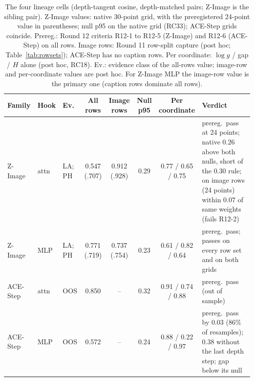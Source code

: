 \documentclass[11pt]{article}
\begin{document}
\begin{table}[htbp]
\centering\small
\caption{The four lineage cells (depth-tangent cosine, depth-matched pairs; Z-Image is the sibling pair). Z-Image values: native 30-point grid, with the preregistered 24-point value in parentheses; null p95 on the native grid (RC33); ACE-Step grids coincide. Prereg.: Round 12 criteria R12-1 to R12-5 (Z-Image) and R12-6 (ACE-Step) on all rows. Image rows: Round 11 row-split capture (post hoc; Table~\ref{tab:rowsets}); ACE-Step has no caption rows. Per coordinate: $\log g$ / gap / $H$ alone (post hoc, RC18). Ev.: evidence class of the all-rows value; image-row and per-coordinate values are post hoc. For Z-Image MLP the image-row value is the primary one (caption rows dominate all rows).}
\label{tab:cells}
\setlength\tabcolsep{4pt}\begin{tabularx}{\linewidth}{@{}lllccccL@{}}
\toprule
Family & Hook & Ev. & All rows & Image rows & Null p95 & Per coordinate & Verdict\\
\midrule
Z-Image & attn & LA; PH & 0.547 (.707) & 0.912 (.928) & 0.29 & 0.77 / 0.65 / 0.75 & prereg.\ pass at 24 points; native $0.26$ above both nulls, short of the $0.30$ rule; on image rows (24 points) within $0.07$ of same weights (fails R12-2)\\
Z-Image & MLP & LA; PH & 0.771 (.719) & 0.737 (.754) & 0.23 & 0.61 / 0.82 / 0.64 & prereg.\ pass; passes on every row set and on both grids\\
ACE-Step & attn & OOS & 0.850 & -- & 0.32 & 0.91 / 0.74 / 0.88 & prereg.\ pass (out of sample)\\
ACE-Step & MLP & OOS & 0.572 & -- & 0.24 & 0.88 / 0.22 / 0.97 & prereg.\ pass by $0.03$ ($86\%$ of resamples); $0.38$ without the last depth step; gap below its null\\
\bottomrule
\end{tabularx}
\end{table}
\end{document}
